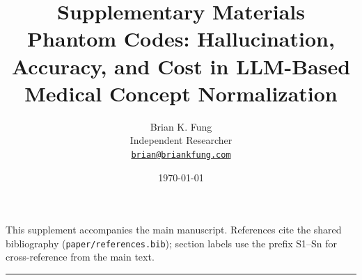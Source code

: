 \documentclass[11pt]{article}
\title{%
  Supplementary Materials \\
  \large Phantom Codes: Hallucination, Accuracy, and Cost in LLM-Based Medical Concept Normalization}
\author{%
  Brian K. Fung \\[2pt]
  \small Independent Researcher \\[2pt]
  \small\href{mailto:brian@briankfung.com}{\texttt{brian@briankfung.com}}}
\date{\today}
\begin{document}
\maketitle

\noindent
This supplement accompanies the main manuscript. References cite the
shared bibliography (\texttt{paper/references.bib}); section labels use
the prefix S1--Sn for cross-reference from the main text.

\tableofcontents
\bigskip






\bigskip
\hrule
\bigskip

\printbibliography[heading=bibintoc, title={References}]
\end{document}
